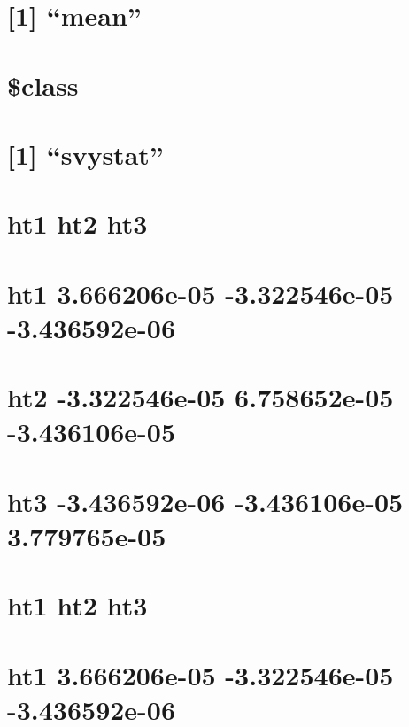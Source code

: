 \documentclass[]{book}
\theoremstyle{definition}
\theoremstyle{definition}
\theoremstyle{definition}
\theoremstyle{remark}
\begin{document}
\section{\texorpdfstring{{[}1{]} ``mean''}{{[}1{]} mean}}\label{mean}

\section{}\label{section-57}

\section{\$class}\label{class}

\section{\texorpdfstring{{[}1{]}
``svystat''}{{[}1{]} svystat}}\label{svystat}

\section{ht1 ht2 ht3}\label{ht1-ht2-ht3-3}

\section{ht1 3.666206e-05 -3.322546e-05
-3.436592e-06}\label{ht1-3.666206e-05--3.322546e-05--3.436592e-06-1}

\section{ht2 -3.322546e-05 6.758652e-05
-3.436106e-05}\label{ht2--3.322546e-05-6.758652e-05--3.436106e-05-1}

\section{ht3 -3.436592e-06 -3.436106e-05
3.779765e-05}\label{ht3--3.436592e-06--3.436106e-05-3.779765e-05-1}

\section{ht1 ht2 ht3}\label{ht1-ht2-ht3-4}

\section{ht1 3.666206e-05 -3.322546e-05
-3.436592e-06}\label{ht1-3.666206e-05--3.322546e-05--3.436592e-06-2}
\end{document}
